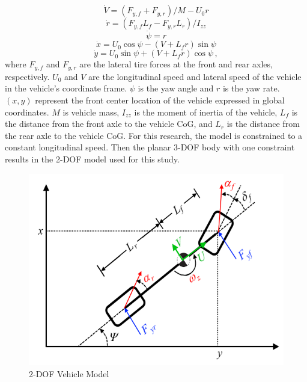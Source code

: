 \documentclass[12pt,onecolumn]{report}
\begin{document}
\begin{equation}\label{e:2DOF_Vdot}
\dot{V} = \left(F_{y,f} + F_{y,r}\right)/{M - U_0r} 
\end{equation}
\begin{equation}\label{e:2DOF_rdot}
\dot{r} = \left(F_{y,f}L_f - F_{y,r}L_r\right)/I_{zz}
\end{equation}
\begin{equation}\label{e:2DOF_psidot}
\dot{\psi} = r 
\end{equation}
\begin{equation}\label{e:2DOF_xdot}
\dot{x} = U_0\cos{\psi}-\left(V+L_fr\right)\sin{\psi}
\end{equation}
\begin{equation}\label{e:2DOF_ydot}
\dot{y} = U_0\sin{\psi}+\left(V+L_fr\right)\cos{\psi} \,,
\end{equation}
%
where $F_{y,f}$ and $F_{y,r}$ are the lateral tire forces at the front and rear axles, respectively. $U_0$ and $V$ are the longitudinal speed and lateral speed of the vehicle in the vehicle's coordinate frame. $\psi$ is the yaw angle and $r$ is the yaw rate. $\left(x,y\right)$ represent the front center location of the vehicle expressed in global coordinates. $M$ is vehicle mass, $I_{zz}$ is the moment of inertia of the vehicle, $L_f$ is the distance from the front axle to the vehicle CoG, and $L_r$ is the distance from the rear axle to the vehicle CoG. For this research, the model is constrained to a constant longitudinal speed. Then the planar 3-DOF body with one constraint results in the 2-DOF model used for this study.

\begin{figure}
	\centering
	\includegraphics[width=0.8\columnwidth]{Figs/2DOF_haraus.png}
	\caption{\small 2-DOF Vehicle Model}  
	\label{fig:2DOF}
\end{figure}
\end{document}

